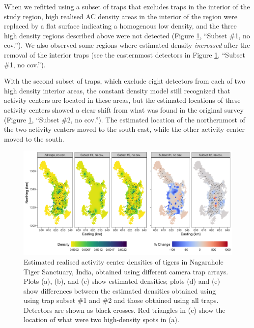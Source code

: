 \documentclass[10pt,a4paper]{article}
\begin{document}
When we refitted using a subset of traps that excludes traps in the interior of the study region, high realised AC density areas in the interior of the region were replaced by a flat surface indicating a homogenous low density, and the three high density regions described above were not detected  (Figure \ref{tigernocov}, ``Subset \#1, no cov.''). We also observed some regions where estimated density {\it increased} after the removal of the interior traps (see the easternmost detectors in Figure \ref{tigernocov}, ``Subset \#1, no cov.''). %

With the second subset of traps, which exclude eight detectors from each of two high density interior areas, the constant density model still recognized that activity centers are located in these areas, but the estimated locations of these activity centers showed a clear shift from what was found in the original survey (Figure \ref{tigernocov}, ``Subset \#2, no cov.''). The estimated location of the northernmost of the two activity centers moved to the south east, while the other activity center moved to the south.

\begin{figure}[htbp]
\centering
\includegraphics[width=1\textwidth]{tiger_surfaces_nocovs_v1.png}
\caption{Estimated realised activity center densities of tigers in Nagarahole Tiger Sanctuary, India, obtained using different camera trap arrays. Plots (a), (b), and (c) show estimated densities; plots (d) and (e) show differences between the estimated densities obtained using using trap subset \#1 and \#2 and those obtained using all traps. Detectors are shown as black crosses. Red triangles in (c) show the location of what were two high-density spots in (a).}
\label{tigernocov}
\end{figure}
\end{document}
